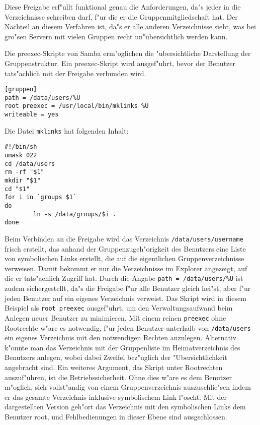 \documentclass{scrartcl}
\newcommand{\param}{\texttt}
\newcommand{\datei}{\texttt}
\begin{document}
Diese Freigabe erf"ullt funktional genau die Anforderungen, da"s
jeder in die Verzeichnisse schreiben darf, f"ur die er die
Gruppenmitgliedschaft hat. Der Nachteil an diesem Verfahren ist, da"s
er alle anderen Verzeichnisse sieht, was bei gro"sen Servern mit
vielen Gruppen recht un"ubersichtlich werden kann.

Die preexec-Skripte von Samba erm"oglichen die "ubersichtliche
Darstellung der Gruppenstruktur. Ein preexec-Skript wird ausgef"uhrt,
bevor der Benutzer tats"achlich mit der Freigabe verbunden wird.

{\small\begin{verbatim}
[gruppen]
path = /data/users/%U
root preexec = /usr/local/bin/mklinks %U
writeable = yes
\end{verbatim}
}

Die Datei \datei{mklinks} hat folgenden Inhalt:

{\small\begin{verbatim}
#!/bin/sh
umask 022
cd /data/users
rm -rf "$1"
mkdir "$1"
cd "$1"
for i in `groups $1`
do
        ln -s /data/groups/$i .
done
\end{verbatim}
}
    
Beim Verbinden an die Freigabe wird das Verzeichnis
\datei{/data/users/username} frisch erstellt, das anhand der
Gruppenzugeh"origkeit des Benutzers eine Liste von symbolischen
Links erstellt, die auf die eigentlichen Gruppenverzeichnisse
verweisen. Damit bekommt er nur die Verzeichnisse im Explorer
angezeigt, auf die er tats"achlich Zugriff hat. Durch die Angabe
\param{path = /data/users/\%U} ist zudem sichergestellt, da"s die
Freigabe f"ur alle Benutzer gleich hei"st, aber f"ur jeden
Benutzer auf ein eigenes Verzeichnis verweist. Das Skript wird in
diesem Beispiel als \param{root preexec} ausgef"uhrt, um den
Verwaltungsaufwand beim Anlegen neuer Benutzer zu minimieren. Mit
einem reinen \param{preexec} ohne Rootrechte w"are es notwendig,
f"ur jeden Benutzer unterhalb von \param{/data/users} ein eigenes
Verzeichnis mit den notwendigen Rechten anzulegen. Alternativ
k"onnte man das Verzeichnis mit der Gruppenliste im
Heimatverzeichnis des Benutzers anlegen, wobei dabei Zweifel
bez"uglich der "Ubersichtlichkeit angebracht sind. Ein weiteres
Argument, das Skript unter Rootrechten auszuf"uhren, ist die
Betriebssicherheit. Ohne dies w"are es dem Benutzer m"oglich, sich
vollst"andig von einem Gruppenverzeichnis auszuschlie"sen indem er
das gesamte Verzeichnis inklusive symbolischem Link l"oscht. Mit
der dargestellten Version geh"ort das Verzeichnis mit den
symbolischen Links dem Benutzer root, und Fehlbedienungen in
dieser Ebene sind ausgschlossen.
\end{document}
